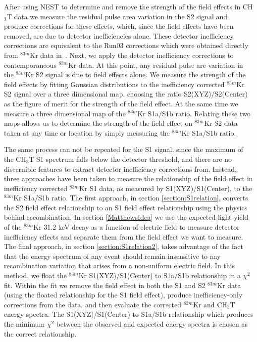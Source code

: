 After using NEST to determine and remove the strength of the field effects in CH$_3$T data we measure the residual pulse area variation in the S2 signal and produce corrections for these effects, which, since the field effects have been removed, are due to detector inefficiencies alone.  These detector inefficiency corrections are equivalent to the Run03 corrections which were obtained directly from $^{83m}$Kr data in~\cite{Run03Reanalysis}.  Next, we apply the detector inefficiency corrections to contemporaneous $^{83m}$Kr data.  At this point, any residual pulse are variation in the $^{83m}$Kr S2 signal is due to field effects alone.  We measure the strength of the field effects by fitting Gaussian distributions to the inefficiency corrected $^{83m}$Kr S2 signal over a three dimensional map, choosing the ratio S2(XYZ)/S2(Center) as the figure of merit for the strength of the field effect.  At the same time we measure a three dimensional map of the $^{83m}$Kr S1a/S1b ratio.  Relating these two maps allows us to determine the strength of the field effect on $^{83m}$Kr S2 data taken at any time or location by simply measuring the $^{83m}$Kr S1a/S1b ratio. 


The same process can not be repeated for the S1 signal, since the maximum of the CH$_3$T S1 spectrum falls below the detector threshold, and there are no discernible features to extract detector inefficiency corrections from.  Instead, three approaches have been taken to measure the relationship of the field effect in inefficiency corrected $^{83m}$Kr S1 data, as measured by S1(XYZ)/S1(Center), to the $^{83m}$Kr S1a/S1b ratio.  The first approach, in section \ref{section:S1relation}, converts the S2 field effect relationship to an S1 field effect relationship using the physics behind recombination.  In section \ref{MatthewsIdea} we use the expected light yield of the $^{83m}$Kr 31.2 keV decay as a function of electric field to measure detector inefficiency effects and separate them from the field effect we want to measure.  The final approach, in section \ref{section:S1relation2}, takes advantage of the fact that the energy spectrum of any event should remain insensitive to any recombination variation that arises from a non-uniform electric field.  In this method, we float the $^{83m}$Kr S1(XYZ)/S1(Center) to S1a/S1b relationship in a $\chi^2$ fit.  Within the fit we remove the field effect in both the S1 and S2 $^{83m}$Kr data (using the floated relationship for the S1 field effect), produce inefficiency-only corrections from the data, and then evaluate the corrected $^{83m}$Kr and CH$_3$T energy spectra.  The  S1(XYZ)/S1(Center) to S1a/S1b relationship which produces the minimum $\chi^2$ between the observed and expected energy spectra is chosen as the correct relationship.

